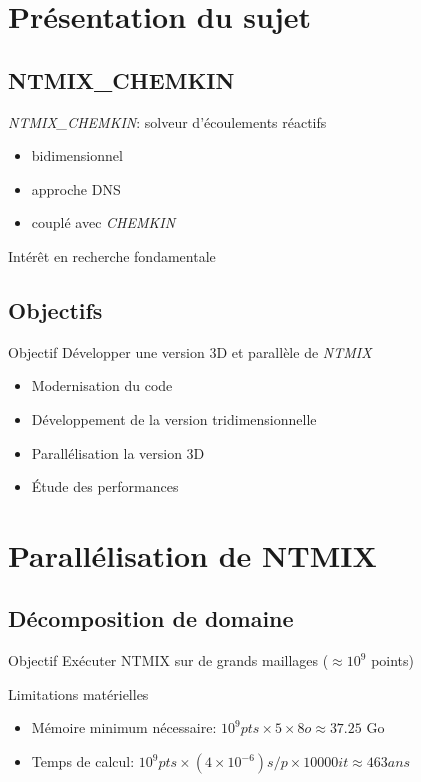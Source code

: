 \documentclass{beamer}
\begin{document}
%
%
\section{Présentation du sujet}
\subsection{NTMIX\_CHEMKIN}
\begin{frame}
  \textit{NTMIX\_CHEMKIN}: solveur d'écoulements réactifs
  \begin{itemize}
  \item bidimensionnel
  \item approche DNS
  \item couplé avec \textit{CHEMKIN}
  \end{itemize}
  Intérêt en recherche fondamentale
  
\end{frame}


\subsection{Objectifs}
\begin{frame}

  \begin{block}{Objectif}
    Développer une version 3D et parallèle de \textit{NTMIX}
  \end{block}
  \begin{itemize}
  \item Modernisation du code
  \item Développement de la version tridimensionnelle
  \item Parallélisation la version 3D
  \item Étude des performances
  \end{itemize} 
\end{frame}


%
%

\section{Parallélisation de NTMIX}
\subsection{Décomposition de domaine}
\begin{frame}
  \begin{block}{Objectif}
    Exécuter NTMIX sur de grands maillages ($\approx 10^9$ points)
  \end{block}
  \pause
  \begin{alertblock}{Limitations matérielles}
    \begin{itemize}
    \item     Mémoire minimum nécessaire: $10^9pts \times 5 \times 8o \approx 37.25$ Go
    \item     Temps de calcul: $10^9 pts\times(4\times10^{-6})s/p\times10000it\approx463ans$
    \end{itemize}
  \end{alertblock}
  
\end{frame}
\end{document}
